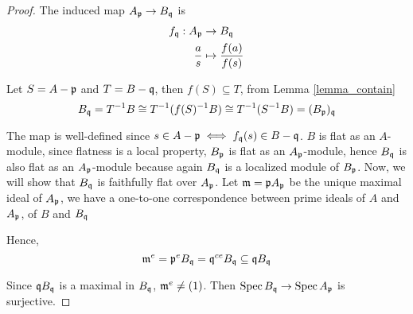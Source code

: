 \begin{proof}
	The induced map $A_{\mathfrak{p}} \to B_{\mathfrak{q}}$ is 
	\begin{align*}
		f_{\mathfrak{q}}: A_{\mathfrak{p}} &\to B_{\mathfrak{q}} \\
				\frac{a}{s} &\mapsto \frac{f(a)}{f(s)}
	\end{align*}
	
	Let $S = A - \mathfrak{p}$ and $T = B - \mathfrak{q}$, then $f(S) \subseteq T$, from Lemma \ref{lemma_contain}
	$$
		B_{\mathfrak{q}} = T^{-1} B \cong T^{-1} (f(S)^{-1} B) \cong T^{-1} (S^{-1} B) = (B_{\mathfrak{p}})_{\mathfrak{q}}
	$$
	
	The map is well-defined since $s \in A - \mathfrak{p} \iff f_{\mathfrak{q}}(s) \in B - \mathfrak{q}$. $B$ is flat as an $A$-module, since flatness is a local property, $B_{\mathfrak{p}}$ is flat as an $A_{\mathfrak{p}}$-module, hence $B_{\mathfrak{q}}$ is also flat as an $A_{\mathfrak{p}}$-module because again $B_{\mathfrak{q}}$ is a localized module of $B_{\mathfrak{p}}$. Now, we will show that $B_{\mathfrak{q}}$ is faithfully flat over $A_{\mathfrak{p}}$. Let $\mathfrak{m} = \mathfrak{p} A_{\mathfrak{p}}$ be the unique maximal ideal of $A_{\mathfrak{p}}$, we have a one-to-one correspondence between prime ideals of $A$ and $A_{\mathfrak{p}}$, of $B$ and $B_{\mathfrak{q}}$
	
	\begin{center}
	\end{center}
	
	Hence,
	$$
		\mathfrak{m}^e = \mathfrak{p}^e B_{\mathfrak{q}} = \mathfrak{q}^{ce} B_{\mathfrak{q}} \subseteq \mathfrak{q} B_{\mathfrak{q}}
	$$
	
	Since $\mathfrak{q} B_{\mathfrak{q}}$ is a maximal in $B_{\mathfrak{q}}$, $\mathfrak{m}^e \neq (1)$. Then $\operatorname{Spec} B_{\mathfrak{q}} \to \operatorname{Spec} A_{\mathfrak{p}}$ is surjective.
\end{proof}

